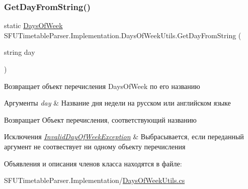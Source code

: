 \subsubsection{\texorpdfstring{Get\+Day\+From\+String()}{GetDayFromString()}}
{\footnotesize\ttfamily static \hyperlink{namespace_s_f_u_timetable_parser_1_1_core_1_1_entities_a24625cfb0f8355baf5eebfe2032c4169}{Days\+Of\+Week} S\+F\+U\+Timetable\+Parser.\+Implementation.\+Days\+Of\+Week\+Utils.\+Get\+Day\+From\+String (\begin{DoxyParamCaption}\item[{string}]{day }\end{DoxyParamCaption})\hspace{0.3cm}{\ttfamily [static]}}



Возвращает объект перечисления Days\+Of\+Week по его названию 


\begin{DoxyParams}{Аргументы}
{\em day} & Название дня недели на русском или английском языке \\
\hline
\end{DoxyParams}
\begin{DoxyReturn}{Возвращает}
Объект перечисления, соответствующий названию 
\end{DoxyReturn}

\begin{DoxyExceptions}{Исключения}
{\em \hyperlink{class_s_f_u_timetable_parser_1_1_implementation_1_1_invalid_day_of_week_exception}{Invalid\+Day\+Of\+Week\+Exception}} & Выбрасывается, если переданный аргумент не соотвествует ни одному объекту перечисления \\
\hline
\end{DoxyExceptions}


Объявления и описания членов класса находятся в файле\+:\begin{DoxyCompactItemize}
\item 
S\+F\+U\+Timetable\+Parser.\+Implementation/\hyperlink{_days_of_week_utils_8cs}{Days\+Of\+Week\+Utils.\+cs}\end{DoxyCompactItemize}
